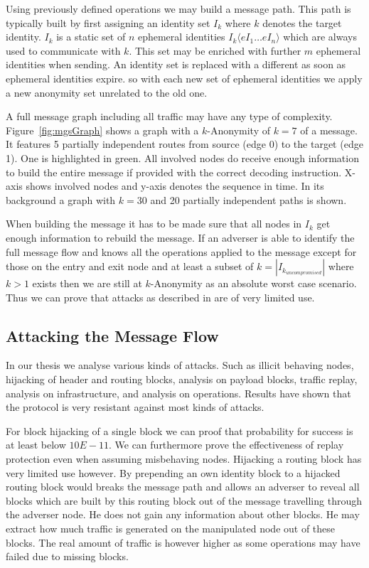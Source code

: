 \documentclass[9pt,journal,compsoc]{IEEEtran}
\begin{document}
Using previously defined operations we may build a message path. This path is typically built by first assigning an identity set $I_k$ where  $k$ denotes the target identity. $I_k$ is a static set of $n$ ephemeral identities $I_k\langle eI_1 \ldots eI_n\rangle$ which are always used to communicate with $k$. This set may be enriched with further $m$ ephemeral identities when sending. An identity set is replaced with a different as soon as ephemeral identities expire. so with each new set of ephemeral identities we apply a new anonymity set unrelated to the old one.

A full message graph including all traffic may have any type of complexity. Figure~\ref{fig:mgsGraph} shows a graph with a $k$-Anonymity of $k=7$ of a message. It features 5 partially independent routes from source (edge 0) to the target (edge 1). One is highlighted in green. All involved nodes do receive enough information to build the entire message if provided with the correct decoding instruction. X-axis shows involved nodes and y-axis denotes the sequence in time. In its background a graph with $k=30$ and 20 partially independent paths is shown.

When building the message it has to be made sure that all nodes in $I_k$ get enough information to rebuild the message. If an adverser is able to identify the full message flow and knows all the operations applied to the message except for those on the entry and exit node and at least a subset of $k=|I_{k_{uncompromised}}|$ where $k>1$ exists then we are still at $k$-Anonymity as an absolute worst case scenario. Thus we can prove that attacks as described in \cite{DanSer04} are of very limited use. 

\subsection{Attacking the Message Flow}
In our thesis\cite{messageVortex} we analyse various kinds of attacks. Such as illicit behaving nodes, hijacking of header and routing blocks, analysis on payload blocks, traffic replay, analysis on infrastructure, and analysis on operations. Results have shown that the protocol is very resistant against most kinds of attacks.

For block hijacking of a single block we can proof that probability for success is at least below $10E-11$. We can furthermore prove the effectiveness of replay protection even when assuming misbehaving nodes. Hijacking a routing block has very limited use however. By prepending an own identity block to a hijacked routing block would breaks the message path and allows an adverser to reveal all blocks which are built by this routing block out of the message travelling through the adverser node. He does not gain any information about other blocks. He may extract how much traffic is generated on the manipulated node out of these blocks. The real amount of traffic is however higher as some operations may have failed due to missing blocks.
\end{document}
